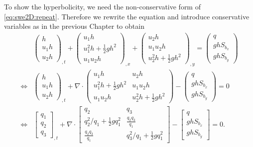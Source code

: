 \documentclass[a4paper,12pt]{article}
\theoremstyle{definition}
\theoremstyle{definition}
\begin{document}
To show the hyperbolicity, we need the non-conservative form of \eqref{eq:swe2D:repeat}.
Therefore we rewrite the equation and introduce conservative variables as in the previous Chapter to obtain
\begin{align} 
&\begin{pmatrix}
h\\
u_1h\\
u_2h
\end{pmatrix}_{,t} +
\begin{pmatrix}
u_1h\\
u_1^2h + \frac{1}{2}gh^2\\
u_1u_2h
\end{pmatrix}_{,x} +
\begin{pmatrix}
u_2h\\
u_1u_2h\\
u_2^2h + \frac{1}{2}gh^2
\end{pmatrix}_{,y} =
\begin{pmatrix}
q\\
ghS_{b_x}\\
ghS_{b_y}
\end{pmatrix}
\\ \Leftrightarrow
&\begin{pmatrix}
h\\
u_1h\\
u_2h
\end{pmatrix}_{,t} +
\nabla \cdot \begin{pmatrix}
u_1h & u_2h\\
u_1^2h + \frac{1}{2}gh^2 & u_1u_2h\\
u_1u_2h & u_2^2h + \frac{1}{2}gh^2
\end{pmatrix} -
\begin{pmatrix}
q\\
ghS_{b_x}\\
ghS_{b_y}
\end{pmatrix} = 0
\\ \Leftrightarrow 
&\begin{bmatrix}
q_1\\
q_2\\
q_3
\end{bmatrix}_{,t} +
\nabla \cdot \begin{bmatrix}
q_2 & q_3\\
q_2^2/q_1 + \frac{1}{2}gq_1^2 & \frac{q_2q_3}{q_1}\\
\frac{q_2q_3}{q_1} & q_3^2/q_1 + \frac{1}{2}gq_1^2
\end{bmatrix} -
\begin{bmatrix}
q\\
ghS_{b_x}\\
ghS_{b_y}
\end{bmatrix} = 0.
\end{align}
\end{document}
